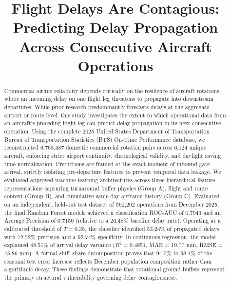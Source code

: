 \documentclass[conference]{IEEEtran}
\begin{document}
\title{Flight Delays Are Contagious: Predicting Delay Propagation Across Consecutive Aircraft Operations}

\author{
}

\maketitle

\begin{abstract}
Commercial airline reliability depends critically on the resilience of aircraft rotations, where an incoming delay on one flight leg threatens to propagate into downstream departures. While prior research predominantly forecasts delays at the aggregate airport or route level, this study investigates the extent to which operational data from an aircraft's preceding flight leg can predict delay propagation in its next consecutive operation. Using the complete 2025 United States Department of Transportation Bureau of Transportation Statistics (BTS) On-Time Performance database, we reconstructed 6,768,487 domestic commercial rotation pairs across 6,124 unique aircraft, enforcing strict airport continuity, chronological validity, and daylight saving time normalization. Predictions are framed at the exact moment of inbound gate arrival, strictly isolating pre-departure features to prevent temporal data leakage. We evaluated approved machine learning architectures across three hierarchical feature representations capturing turnaround buffer physics (Group A), flight and route context (Group B), and cumulative same-day airframe history (Group C). Evaluated on an independent, held-out test dataset of 562,202 operations from December 2025, the final Random Forest models achieved a classification ROC-AUC of 0.7943 and an Average Precision of 0.7150 (relative to a 26.48\% baseline delay rate). Operating at a calibrated threshold of $T = 0.35$, the classifier identified 53.24\% of propagated delays with 72.52\% precision and a 92.74\% specificity. In continuous regression, the model explained 48.51\% of arrival delay variance ($R^2 = 0.4851$, MAE = 19.77 min, RMSE = 45.86 min). A formal shift-share decomposition proves that 94.0\% to 98.4\% of the seasonal test error increase reflects December population composition rather than algorithmic decay. These findings demonstrate that rotational ground buffers represent the primary structural vulnerability governing delay contagiousness.
\end{abstract}
\end{document}

